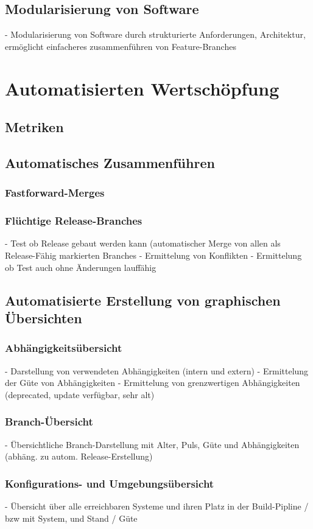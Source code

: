 \subsection{Modularisierung von Software}
- Modularisierung von Software durch strukturierte Anforderungen, Architektur, ermöglicht einfacheres zusammenführen von Feature-Branches
\section{Automatisierten Wertschöpfung}
\subsection{Metriken}
\label{subsec:auto-values-metrics}
\subsection{Automatisches Zusammenführen}
\subsubsection{Fastforward-Merges}
\subsubsection{Flüchtige Release-Branches}
- Test ob Release gebaut werden kann (automatischer Merge von allen als Release-Fähig markierten Branches
- Ermittelung von Konflikten
- Ermittelung ob Test auch ohne Änderungen lauffähig
\subsection{Automatisierte Erstellung von graphischen Übersichten}
\subsubsection{Abhängigkeitsübersicht}
- Darstellung von verwendeten Abhängigkeiten (intern und extern)
- Ermittelung der Güte von Abhängigkeiten
- Ermittelung von grenzwertigen Abhängigkeiten (deprecated, update verfügbar, sehr alt)
\subsubsection{Branch-Übersicht}
- Übersichtliche Branch-Darstellung mit Alter, Puls, Güte und Abhängigkeiten (abhäng. zu autom. Release-Erstellung)
\subsubsection{Konfigurations- und Umgebungsübersicht}
- Übersicht über alle erreichbaren Systeme und ihren Platz in der Build-Pipline / bzw mit System, und Stand / Güte
